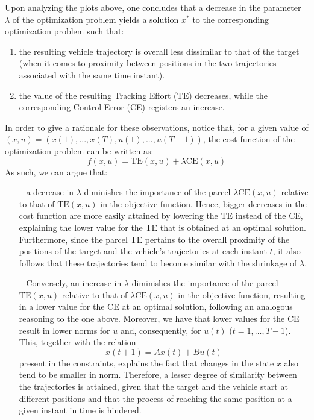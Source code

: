 \documentclass[12pt]{article}
\begin{document}
Upon analyzing the plots above, one concludes that a decrease in the parameter $\lambda$ of the optimization problem yields a solution $x^*$ to the corresponding optimization problem such that:
\begin{enumerate}
    \item the resulting vehicle trajectory is overall less dissimilar to that of the target (when it comes to proximity between positions in the two trajectories associated with the same time instant).
    \item the value of the resulting Tracking Effort (TE) decreases, while the corresponding Control Error (CE) registers an increase.
\end{enumerate}
In order to give a rationale for these observations, notice that, for a given value of $(x, u) = (x(1), ..., x(T), u(1), ..., u(T - 1))$, the cost function of the optimization problem can be written as:
\vspace{-0.2em}
\[
    f(x, u) = \text{TE}(x, u) + \lambda \text{CE}(x, u)
\]
As such, we can argue that:
\begin{itemize}
    \item[--] a decrease in $\lambda$ diminishes the importance of the parcel $\lambda \text{CE}(x, u)$ relative to that of $\text{TE}(x, u)$ in the objective function. Hence, bigger decreases in the cost function are more easily attained by lowering the TE instead of the CE, explaining the lower value for the TE that is obtained at an optimal solution. Furthermore, since the parcel TE pertains to the overall proximity of the positions of the target and the vehicle's trajectories at each instant $t$, it also follows that these trajectories tend to become similar with the shrinkage of $\lambda$.
    \item[--] Conversely, an increase in $\lambda$ diminishes the importance of the parcel $\text{TE}(x, u)$ relative to that of $\lambda \text{CE}(x, u)$ in the objective function, resulting in a lower value for the CE at an optimal solution, following an analogous reasoning to the one above. Moreover, we have that lower values for the CE result in lower norms for $u$ and, consequently, for $u(t)$ ($t = 1, ..., T-1$). This, together with the relation
    \[
        x(t + 1) = Ax(t) + Bu(t)
    \]
    present in the constraints, explains the fact that changes in the state $x$ also tend to be smaller in norm. Therefore, a lesser degree of similarity between the trajectories is attained, given that the target and the vehicle start at different positions and that the process of reaching the same position at a given instant in time is hindered.
\end{itemize}
\end{document}
